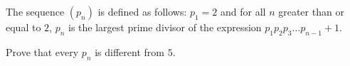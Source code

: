 The sequence $(p_n)$ is defined as follows: $p_1=2$ and for all $n$ greater than or equal to $2$,  $p_n$ is the largest prime divisor of the expression $p_1p_2p_3\ldots p_{n-1}+1$.

Prove that every $p_n$ is different from $5$.